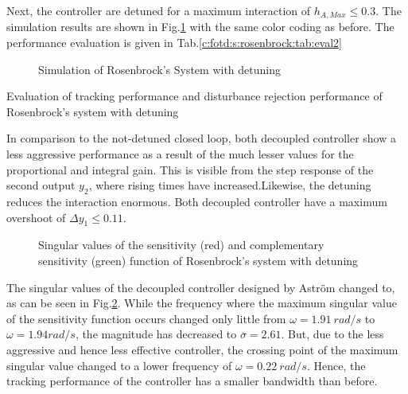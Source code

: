 Next, the controller are detuned for a maximum interaction of $h_{A,Max} \leq 0.3$. The simulation results are shown in Fig.\ref{c:fotd:s:rosenbrock:f:SimDetuned} with the same color coding as before. The performance evaluation is given in Tab.\ref{c:fotd:s:rosenbrock:tab:eval2}\\

\begin{figure}[H]\centering

\caption{Simulation of Rosenbrock's System with detuning}
\label{c:fotd:s:rosenbrock:f:SimDetuned}
\end{figure}

\begin{table}[H]
\centering
\caption{Evaluation of tracking performance and disturbance rejection performance of Rosenbrock's system with detuning}
\label{c:fotd:s:rosenbrock:tab:eval2}

\end{table}

In comparison to the not-detuned closed loop, both decoupled controller show a less aggressive performance as a result of the much lesser values for the proportional and integral gain. This is visible from the step response of the second output $y_2$, where rising times have increased.Likewise, the detuning reduces the interaction enormous. Both decoupled controller have a maximum overshoot of $\Delta y_{1} \leq 0.11$.\\

\begin{figure}[H]\centering

\caption{Singular values of the sensitivity (red) and complementary sensitivity (green) function of Rosenbrock's system with detuning}
\label{c:fotd:s:rosenbrock:f:SingValDetuned}
\end{figure}

The singular values of the decoupled controller designed by Astr\"om changed to, as can be seen in Fig.\ref{c:fotd:s:rosenbrock:f:SingValDetuned}. While the frequency where the maximum singular value of the sensitivity function occurs changed only little from $\omega = 1.91~rad/s$ to $\omega = 1.94 rad/s$, the magnitude has decreased to $\overline{\sigma} = 2.61$. But, due to the less aggressive and hence less effective controller, the crossing point of the maximum singular value changed to a lower frequency  of $\omega = 0.22~rad/s$. Hence, the tracking performance of the controller has a smaller bandwidth than before.\\

